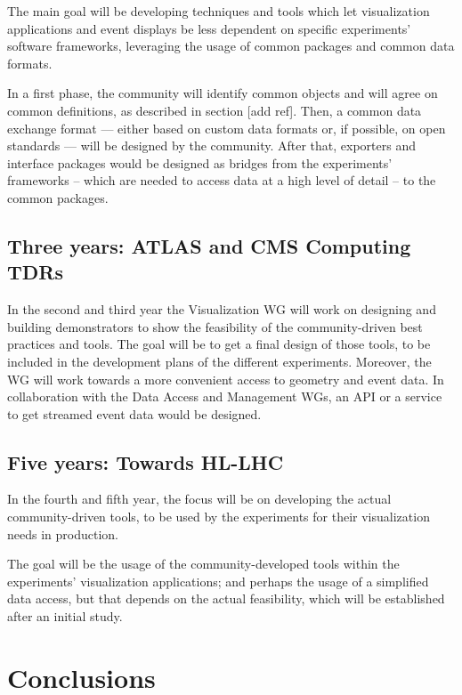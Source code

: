 \documentclass[12pt,a4paper]{article}
\begin{document}
The main goal will be developing techniques and tools which let visualization applications and event displays be
less dependent on specific experiments’ software frameworks, leveraging the usage of common packages and common data formats.

In a first phase, the community will identify common objects and will agree on common definitions, as described in
section [add ref]. Then, a common data exchange format --- either based on custom data formats or, if possible, on
open standards --- will be designed by the community. After that, exporters and interface packages would be designed
as bridges from the experiments’ frameworks -- which are needed to access data at a high level of detail -- to the common packages.

\hypertarget{three-year}{%
\subsection{Three years: ATLAS and CMS Computing TDRs}\label{three-year}}

In the second and third year the Visualization WG will work on designing and building demonstrators to show the feasibility of
the community-driven best practices and tools. The goal will be to get a final design of those tools, to be included in the development
plans of the different experiments. Moreover, the WG will work towards a more convenient access to geometry and event data.
In collaboration with the Data Access and Management WGs, an API or a service to get streamed event data would be designed.

\hypertarget{five-year}{%
\subsection{Five years: Towards HL-LHC}\label{five-year}}

In the fourth and fifth year, the focus will be on developing the actual community-driven tools, to be used by the experiments
for their visualization needs in production.

The goal will be the usage of the community-developed tools within the experiments’ visualization applications; and
perhaps the usage of a simplified data access, but that depends on the actual feasibility, which will be established
after an initial study.

\hypertarget{conclusions}{%
\section{Conclusions}\label{conclusions}}
\end{document}
